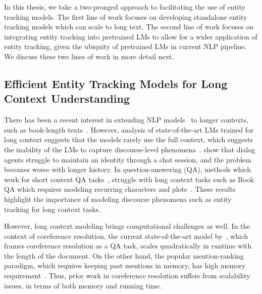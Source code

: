 \documentclass[12pt]{thesis-umich}[thesis]
\begin{document}
In this thesis, we take a two-pronged approach to facilitating the use of entity tracking models. The first line of work focuses on developing standalone entity tracking models which can scale to long text. The second line of work focuses on integrating entity tracking into pretrained LMs to allow for a wider application of entity tracking, given the ubiquity of pretrained LMs in current NLP pipeline. We discuss these two lines of work in more detail next.   






\subsection{Efficient Entity Tracking  Models for Long Context Understanding} 
There has been a recent interest in extending NLP models~\cite{beltagy2020longformer, roy-etal-2021-efficient} to longer contexts, such as book-length texts~\cite{kocisky2018narrative, chen-etal-2022-summscreen, pang-etal-2022-quality, shaham-etal-2022-scrolls, xu-etal-2022-beyond}. 
However, analysis of state-of-the-art LMs trained for long context suggests that the models rarely use the full context, which suggests the inability of the LMs to capture discourse-level phenomena~\cite{sun-etal-2021-long}.  
\citet{shuster-etal-2022-state} show that dialog agents struggle to maintain an identity through a chat session, and the problem becomes worse with longer history. 
In question-answering (QA), methods which work for short context QA tasks~\cite{lewis-etal-2020-retrieval, karpukhin-etal-2020-dense}, struggle with long context tasks such as Book QA which requires modeling recurring characters and plots~\cite{mou-etal-2021-narrative}.      
These results highlight the importance of modeling discourse phenomena such as entity tracking for long context tasks.  

However, long context modeling brings computational challenges as well. 
In the context of coreference resolution, the current state-of-the-art model by~\citet{wu2019coreference}, which frames coreference resolution as a QA task, scales quadratically in runtime with the length of the document. 
On the other hand, the popular mention-ranking paradigm, which requires keeping past mentions in memory, has high memory requirement~\citep{xia-etal-2020-incremental}. 
Thus, prior work in coreference resolution suffers from scalability issues, in terms of both memory and running time. 
\end{document}
